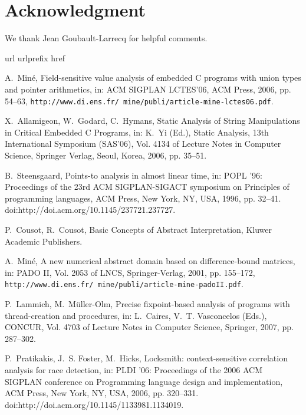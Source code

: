 \documentclass[12pt]{article}
\begin{document}
\section{Acknowledgment}
We thank Jean Goubault-Larrecq for helpful comments.

\begin{thebibliography}{10}
\expandafter\ifx\csname url\endcsname\relax
  \def\url#1{\texttt{#1}}\fi
\expandafter\ifx\csname urlprefix\endcsname\relax\def\urlprefix{URL }\fi
\expandafter\ifx\csname href\endcsname\relax
  \def\href#1#2{#2} \def\path#1{#1}\fi

A.~Min\'e, Field-sensitive value analysis of embedded {C} programs with union
  types and pointer arithmetics, in: ACM SIGPLAN LCTES'06, ACM Press, 2006, pp.
  54--63, \url{http://www.di.ens.fr/~mine/publi/article-mine-lctes06.pdf}.

X.~Allamigeon, W.~Godard, C.~Hymans, Static {A}nalysis of {S}tring
  {M}anipulations in {C}ritical {E}mbedded {C} {P}rograms, in: K.~Yi (Ed.),
  Static Analysis, 13th International Symposium (SAS'06), Vol. 4134 of Lecture
  Notes in Computer Science, Springer Verlag, Seoul, Korea, 2006, pp. 35--51.

B.~Steensgaard, Points-to analysis in almost linear time, in: POPL '96:
  Proceedings of the 23rd ACM SIGPLAN-SIGACT symposium on Principles of
  programming languages, ACM Press, New York, NY, USA, 1996, pp. 32--41.
\newblock \href {http://dx.doi.org/http://doi.acm.org/10.1145/237721.237727}
  {\path{doi:http://doi.acm.org/10.1145/237721.237727}}.

P.~Cousot, R.~Cousot, Basic Concepts of Abstract Interpretation, Kluwer
  Academic Publishers.

A.~Min\'e, A new numerical abstract domain based on difference-bound matrices,
  in: PADO II, Vol. 2053 of LNCS, Springer-Verlag, 2001, pp. 155--172,
  \url{http://www.di.ens.fr/~mine/publi/article-mine-padoII.pdf}.

P.~Lammich, M.~M{\"u}ller-Olm, Precise fixpoint-based analysis of programs with
  thread-creation and procedures, in: L.~Caires, V.~T. Vasconcelos (Eds.),
  CONCUR, Vol. 4703 of Lecture Notes in Computer Science, Springer, 2007, pp.
  287--302.

P.~Pratikakis, J.~S. Foster, M.~Hicks, Locksmith: context-sensitive correlation
  analysis for race detection, in: PLDI '06: Proceedings of the 2006 ACM
  SIGPLAN conference on Programming language design and implementation, ACM
  Press, New York, NY, USA, 2006, pp. 320--331.
\newblock \href {http://dx.doi.org/http://doi.acm.org/10.1145/1133981.1134019}
  {\path{doi:http://doi.acm.org/10.1145/1133981.1134019}}.


\end{thebibliography}
\end{document}
